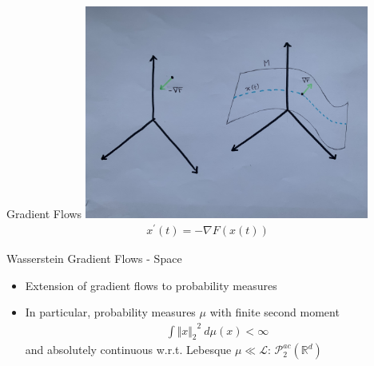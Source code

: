 \documentclass[aspectratio=149]{beamer}
\def\real{\mathbb{R}}
\newcommand{\norm}[2]{\ensuremath{\Vert #1 \Vert_{#2}}}
\begin{document}
\begin{frame}{Gradient Flows}
\centering
\includegraphics[width=0.7\textwidth]{gf}
\begin{align*}
x^\prime(t)=-\nabla F(x(t))
\end{align*}
\end{frame}

\begin{frame}{Wasserstein Gradient Flows - Space}
\begin{itemize}
\item Extension of gradient flows to probability measures
\item In particular, probability measures $\mu$ with finite second moment
\begin{align*}
\int\norm{x}{2}^{2}\ d\mu(x)<\infty
\end{align*}
and absolutely continuous w.r.t. Lebesque $\mu\ll\mathcal{L}$: $\mathcal{P}_{2}^{ac}(\real^{d})$
\end{itemize}
\end{frame}
\end{document}
